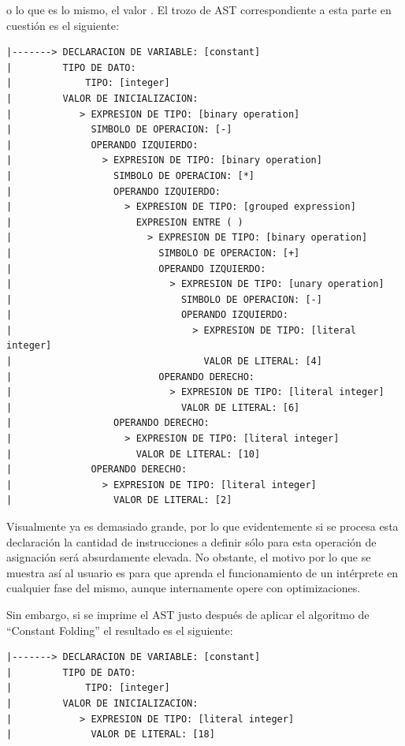 o lo que es lo mismo, el valor . El trozo de AST correspondiente a esta parte en cuestión es el siguiente:

\begin{verbatim}
|-------> DECLARACION DE VARIABLE: [constant]
|         TIPO DE DATO:
|             TIPO: [integer]
|         VALOR DE INICIALIZACION:
|            > EXPRESION DE TIPO: [binary operation]
|              SIMBOLO DE OPERACION: [-]
|              OPERANDO IZQUIERDO:
|                > EXPRESION DE TIPO: [binary operation]
|                  SIMBOLO DE OPERACION: [*]
|                  OPERANDO IZQUIERDO:
|                    > EXPRESION DE TIPO: [grouped expression]
|                      EXPRESION ENTRE ( )
|                        > EXPRESION DE TIPO: [binary operation]
|                          SIMBOLO DE OPERACION: [+]
|                          OPERANDO IZQUIERDO:
|                            > EXPRESION DE TIPO: [unary operation]
|                              SIMBOLO DE OPERACION: [-]
|                              OPERANDO IZQUIERDO:
|                                > EXPRESION DE TIPO: [literal integer]
|                                  VALOR DE LITERAL: [4]
|                          OPERANDO DERECHO:
|                            > EXPRESION DE TIPO: [literal integer]
|                              VALOR DE LITERAL: [6]
|                  OPERANDO DERECHO:
|                    > EXPRESION DE TIPO: [literal integer]
|                      VALOR DE LITERAL: [10]
|              OPERANDO DERECHO:
|                > EXPRESION DE TIPO: [literal integer]
|                  VALOR DE LITERAL: [2]
\end{verbatim}

Visualmente ya es demasiado grande, por lo que evidentemente si se procesa esta declaración la cantidad de instrucciones a definir sólo para esta operación de asignación será absurdamente elevada. No obstante, el motivo por lo que se muestra así al usuario es para que aprenda el funcionamiento de un intérprete en cualquier fase del mismo, aunque internamente opere con optimizaciones.



Sin embargo, si se imprime el AST justo después de aplicar el algoritmo de ``Constant Folding'' el resultado es el siguiente:

\begin{verbatim}
|-------> DECLARACION DE VARIABLE: [constant]
|         TIPO DE DATO:
|             TIPO: [integer]
|         VALOR DE INICIALIZACION:
|            > EXPRESION DE TIPO: [literal integer]
|              VALOR DE LITERAL: [18]

\end{verbatim}

